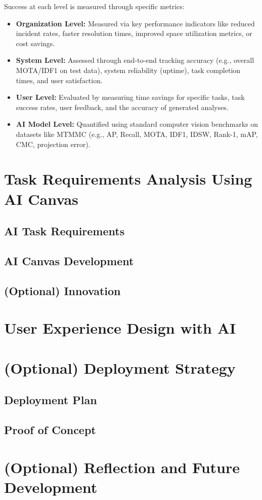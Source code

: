 Success at each level is measured through specific metrics:
\begin{itemize}
    \item \textbf{Organization Level:} Measured via key performance indicators like reduced incident rates, faster resolution times, improved space utilization metrics, or cost savings.
    \item \textbf{System Level:} Assessed through end-to-end tracking accuracy (e.g., overall MOTA/IDF1 on test data), system reliability (uptime), task completion times, and user satisfaction.
    \item \textbf{User Level:} Evaluated by measuring time savings for specific tasks, task success rates, user feedback, and the accuracy of generated analyses.
    \item \textbf{AI Model Level:} Quantified using standard computer vision benchmarks on datasets like MTMMC (e.g., AP, Recall, MOTA, IDF1, IDSW, Rank-1, mAP, CMC, projection error).
\end{itemize}


\section{Task Requirements Analysis Using AI Canvas}
\label{section:ai-canvas}

\subsection{AI Task Requirements}

\subsection{AI Canvas Development}

\subsection{(Optional) Innovation}

\section{User Experience Design with AI}
\label{section:ai-ux}

\section{(Optional) Deployment Strategy}
\label{section:ai-deployment}

\subsection{Deployment Plan}

\subsection{Proof of Concept}

\section{(Optional) Reflection and Future Development}
\label{section:ai-reflection}
